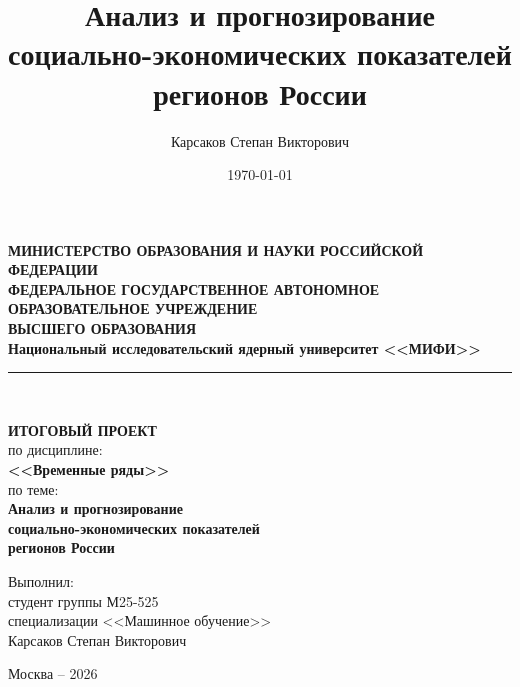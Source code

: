 \documentclass[12pt,a4paper]{report}
\title{Анализ и прогнозирование социально-экономических показателей регионов России}
\author{Карсаков Степан Викторович}
\date{\today}
\begin{document}
\begin{titlepage}
    \begin{center}
        \vspace*{-1cm}

        {\small\textbf{МИНИСТЕРСТВО ОБРАЗОВАНИЯ И НАУКИ РОССИЙСКОЙ ФЕДЕРАЦИИ}}\\[0.15cm]
        {\small\textbf{ФЕДЕРАЛЬНОЕ ГОСУДАРСТВЕННОЕ АВТОНОМНОЕ ОБРАЗОВАТЕЛЬНОЕ УЧРЕЖДЕНИЕ}}\\[0.1cm]
        {\small\textbf{ВЫСШЕГО ОБРАЗОВАНИЯ}}\\[0.3cm]
        {\large\textbf{Национальный исследовательский ядерный университет <<МИФИ>>}}\\[0.8cm]

        \rule{\textwidth}{0.8pt}\\[0.6cm]

        \vspace{1cm}

        {\LARGE\textbf{ИТОГОВЫЙ ПРОЕКТ}}\\[0.4cm]
        {\Large по дисциплине:}\\[0.4cm]
        {\LARGE\textbf{<<Временные ряды>>}}\\[0.8cm]
        {\Large по теме:}\\[0.4cm]

        {\LARGE\textbf{Анализ и прогнозирование}}\\[0.3cm]
        {\LARGE\textbf{социально-экономических показателей}}\\[0.3cm]
        {\LARGE\textbf{регионов России}}\\[1.5cm]

        \vspace{0.8cm}

        \begin{flushright}
            \begin{minipage}{0.55\textwidth}
                \raggedleft
                Выполнил:\\[0.2cm]
                студент группы М25-525\\[0.1cm]
                специализации <<Машинное обучение>>\\[0.2cm]
                Карсаков Степан Викторович\\[0.8cm]
            \end{minipage}
        \end{flushright}

        \vfill

        {\large Москва -- 2026}
    \end{center}
\end{titlepage}
\end{document}
